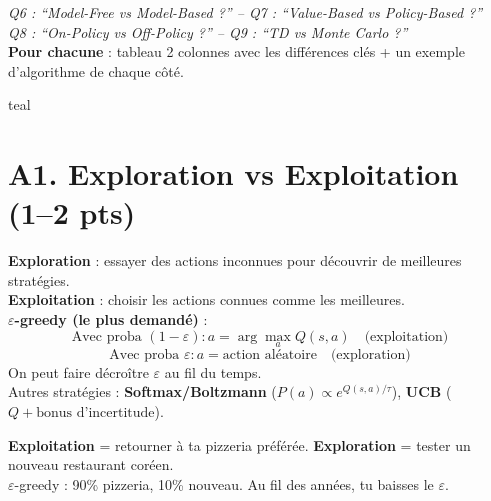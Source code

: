 \documentclass[11pt,a4paper]{article}
\begin{document}
\begin{exambox}
\textit{Q6 : ``Model-Free vs Model-Based ?'' -- Q7 : ``Value-Based vs Policy-Based ?''}\\
\textit{Q8 : ``On-Policy vs Off-Policy ?'' -- Q9 : ``TD vs Monte Carlo ?''}\\[4pt]
\textbf{Pour chacune} : tableau 2 colonnes avec les différences clés + un exemple d'algorithme de chaque côté.
\end{exambox}

\newpage

\begin{tierbox}{teal}
\end{tierbox}

\section{A1. Exploration vs Exploitation (1--2 pts)}

\begin{formbox}
\textbf{Exploration} : essayer des actions inconnues pour découvrir de meilleures stratégies.\\
\textbf{Exploitation} : choisir les actions connues comme les meilleures.\\[6pt]
\textbf{$\varepsilon$-greedy (le plus demandé)} :
$$\text{Avec proba } (1-\varepsilon) : a = \arg\max_a Q(s,a) \quad \text{(exploitation)}$$
$$\text{Avec proba } \varepsilon : a = \text{action aléatoire} \quad \text{(exploration)}$$
On peut faire décroître $\varepsilon$ au fil du temps.\\[4pt]
Autres stratégies : \textbf{Softmax/Boltzmann} ($P(a) \propto e^{Q(s,a)/\tau}$), \textbf{UCB} ($Q + \text{bonus d'incertitude}$).
\end{formbox}

\begin{exbox}
\textbf{Exploitation} = retourner à ta pizzeria préférée. \textbf{Exploration} = tester un nouveau restaurant coréen.\\
$\varepsilon$-greedy : 90\% pizzeria, 10\% nouveau. Au fil des années, tu baisses le $\varepsilon$.
\end{exbox}
\end{document}

